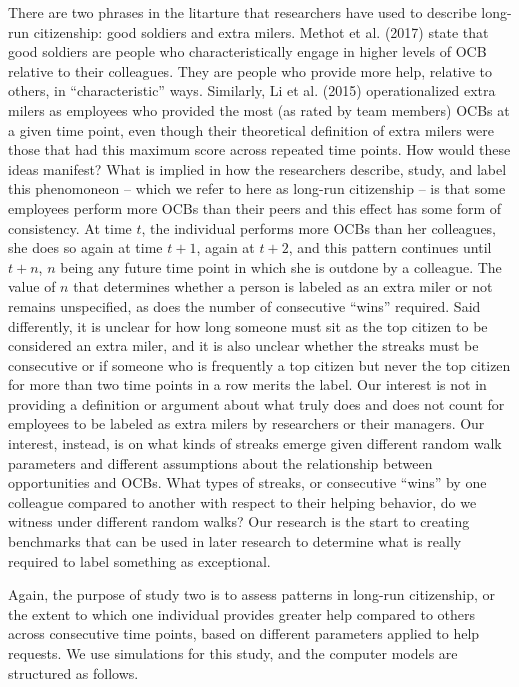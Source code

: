 \documentclass[english,,man]{apa6}
\theoremstyle{definition}
\theoremstyle{definition}
\theoremstyle{definition}
\theoremstyle{remark}
\begin{document}
There are two phrases in the litarture that researchers have used to
describe long-run citizenship: good soldiers and extra milers. Methot et
al. (2017) state that good soldiers are people who characteristically
engage in higher levels of OCB relative to their colleagues. They are
people who provide more help, relative to others, in
\enquote{characteristic} ways. Similarly, Li et al. (2015)
operationalized extra milers as employees who provided the most (as
rated by team members) OCBs at a given time point, even though their
theoretical definition of extra milers were those that had this maximum
score across repeated time points. How would these ideas manifest? What
is implied in how the researchers describe, study, and label this
phenomoneon -- which we refer to here as long-run citizenship -- is that
some employees perform more OCBs than their peers and this effect has
some form of consistency. At time \(t\), the individual performs more
OCBs than her colleagues, she does so again at time \(t + 1\), again at
\(t + 2\), and this pattern continues until \(t + n\), \(n\) being any
future time point in which she is outdone by a colleague. The value of
\(n\) that determines whether a person is labeled as an extra miler or
not remains unspecified, as does the number of consecutive
\enquote{wins} required. Said differently, it is unclear for how long
someone must sit as the top citizen to be considered an extra miler, and
it is also unclear whether the streaks must be consecutive or if someone
who is frequently a top citizen but never the top citizen for more than
two time points in a row merits the label. Our interest is not in
providing a definition or argument about what truly does and does not
count for employees to be labeled as extra milers by researchers or
their managers. Our interest, instead, is on what kinds of streaks
emerge given different random walk parameters and different assumptions
about the relationship between opportunities and OCBs. What types of
streaks, or consecutive \enquote{wins} by one colleague compared to
another with respect to their helping behavior, do we witness under
different random walks? Our research is the start to creating benchmarks
that can be used in later research to determine what is really required
to label something as exceptional.

Again, the purpose of study two is to assess patterns in long-run
citizenship, or the extent to which one individual provides greater help
compared to others across consecutive time points, based on different
parameters applied to help requests. We use simulations for this study,
and the computer models are structured as follows.
\end{document}
